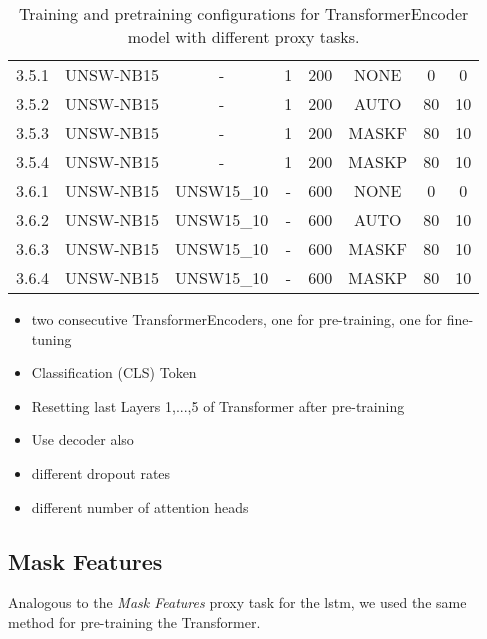 \begin{table}[H]
{\begin{tabular}{cccccccc}
		3.5.1 & UNSW-NB15    & -          & 1           & 200           & NONE       & 0         & 0           \\
		3.5.2 & UNSW-NB15    & -          & 1           & 200           & AUTO       & 80        & 10          \\
		3.5.3 & UNSW-NB15    & -          & 1           & 200           & MASKF      & 80        & 10          \\
		3.5.4 & UNSW-NB15    & -          & 1           & 200           & MASKP      & 80        & 10          \\
		3.6.1 & UNSW-NB15    & UNSW15\_10 & -           & 600           & NONE       & 0         & 0           \\
		3.6.2 & UNSW-NB15    & UNSW15\_10 & -           & 600           & AUTO       & 80        & 10          \\
		3.6.3 & UNSW-NB15    & UNSW15\_10 & -           & 600           & MASKF      & 80        & 10          \\
		3.6.4 & UNSW-NB15    & UNSW15\_10 & -           & 600           & MASKP      & 80        & 10         
	\end{tabular}}
	\caption{Training and pretraining configurations for TransformerEncoder model with different proxy tasks.}
	\label{table:experiments:transformer:configurations}
\end{table}


\begin{itemize}
	\item two consecutive TransformerEncoders, one for pre-training, one for fine-tuning
	\item Classification (CLS) Token
	\item Resetting last Layers 1,...,5 of Transformer after pre-training
	\item Use decoder also
	\item different dropout rates
	\item different number of attention heads
\end{itemize}

\subsection{Mask Features} \label{sec:experiments:transformer:mask_feature}

Analogous to the \textit{Mask Features} proxy task for the \gls{lstm}, we used the same method for pre-training the Transformer.

